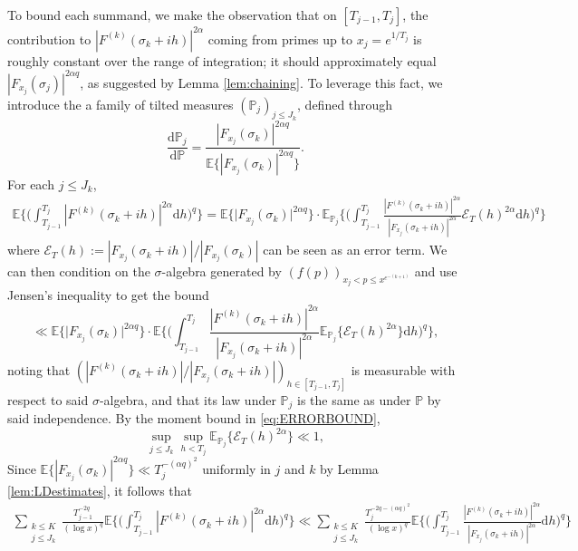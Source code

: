 \documentclass{amsart}
\theoremstyle{definition}
\theoremstyle{remark}
\numberwithin{equation}{section}
\begin{document}
To bound each summand, we make the observation that on $[T_{j-1}, T_j]$, the contribution to $|F^{(k)}(\sigma_k+ih)|^{2\alpha}$ coming from primes up to $x_j=e^{1/T_j}$ is roughly constant over the range of integration; it should approximately equal $|F_{x_j}(\sigma_j)|^{2\alpha q}$, as suggested by Lemma \ref{lem:chaining}. To leverage this fact, we introduce the a family of tilted measures $(\mathbb{P}_j)_{j\leq J_k}$, defined through 
\[
    \frac{\mathrm{d}\mathbb{P}_j}{\mathrm{d}\mathbb{P}}=\frac{|F_{x_j}(\sigma_k)|^{2\alpha q}}{\mathbb{E}\{|F_{x_j}(\sigma_k)|^{2\alpha q}\}}.
\]
 For each $j\leq J_k$, 
\begin{align*}
    \mathbb{E}\bigg\{\bigg(\int_{T_{j-1}}^{T_{j}}|F^{(k)}(\sigma_k+ih)|^{2\alpha}\mathrm{d}h\bigg)^q\bigg\} = \mathbb{E}\Big\{\big|F_{x_j}(\sigma_k)\big|^{2\alpha q}\Big\}\cdot \mathbb{E}_{\mathbb{P}_j}\bigg\{\bigg(\int_{T_{j-1}}^{T_{j}}\frac{|F^{(k)}(\sigma_k+ih)|^{2\alpha}}{|F_{x_j}(\sigma_k+ih)|^{2\alpha}}\mathcal{E}_T(h)^{2\alpha}\mathrm{d}h\bigg)^q\bigg\}
\end{align*}
where $\mathcal{E}_T(h):=|F_{x_j}(\sigma_k+ih)|/|F_{x_j}(\sigma_k)|$ can be seen as an error term. We can then condition on the $\sigma$-algebra generated by $(f(p))_{x_j<p\leq x^{e^{-(k+1)}}}$ and use Jensen's inequality to get the bound
\[
    \ll \mathbb{E}\Big\{\big|F_{x_j}(\sigma_k)\big|^{2\alpha q}\Big\}\cdot \mathbb{E}\bigg\{\bigg(\int_{T_{j-1}}^{T_{j}}\frac{|F^{(k)}(\sigma_k+ih)|^{2\alpha}}{|F_{x_j}(\sigma_k+ih)|^{2\alpha}}\mathbb{E}_{\mathbb{P}_{j}}\big\{\mathcal{E}_T(h)^{2\alpha}\big\}\mathrm{d}h\bigg)^q\bigg\},
\]
noting that $(|F^{(k)}(\sigma_k+ih)|/|F_{x_j}(\sigma_k+ih)|)_{h\in [T_{j-1},T_j]}$ is measurable with respect to said $\sigma$-algebra, and that its law under $\mathbb{P}_j$ is the same as under $\mathbb{P}$ by said independence. By the moment bound in \eqref{eq:ERRORBOUND}, 
\[
    \sup_{j\leq J_k}\sup_{h<T_j} \mathbb{E}_{\mathbb{P}_j}\big\{\mathcal{E}_T(h)^{2\alpha}\big\}\ll 1,
\]
Since $\mathbb{E}\{|F_{x_j}(\sigma_k)|^{2\alpha q}\}\ll T_j^{-(\alpha q)^2}$ uniformly in $j$ and $k$ by Lemma \ref{lem:LDestimates}, it follows that
\begin{align*}
    \sum_{\substack{k\leq K\\ j\leq J_k}} \frac{T_{j-1}^{-2q}}{(\log x)^q} \mathbb{E}\bigg\{\bigg(\int_{T_{j-1}}^{T_{j}}|F^{(k)}(\sigma_k+ih)|^{2\alpha}\mathrm{d}h\bigg)^q\bigg\} \ll  \sum_{\substack{k\leq K\\ j\leq J_k}} \frac{T_{j}^{-2q-(\alpha q)^2}}{(\log x)^q}\mathbb{E}\bigg\{\bigg(\int_{T_{j-1}}^{T_{j}}\frac{|F^{(k)}(\sigma_k+ih)|^{2\alpha}}{|F_{x_j}(\sigma_k+ih)|^{2\alpha}}\mathrm{d}h\bigg)^q\bigg\} 
\end{align*}
\end{document}
